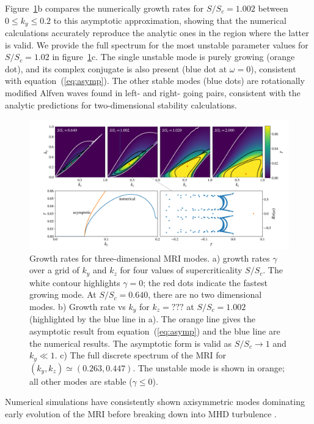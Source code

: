 \documentclass[aps,prl,reprint,superscriptaddress]{revtex4-1}
\newcommand{\SSC}{S/S_{c}}
\begin{document}
Figure~\ref{fig:growth_rate}b compares the numerically growth rates for $\SSC=1.002$ between $0 \le k_y \le 0.2$ to this asymptotic approximation, showing that the numerical calculations accurately reproduce the analytic ones in the region where the latter is valid.
We provide the full spectrum for the most unstable parameter values for $\SSC = 1.02$ in figure~\ref{fig:growth_rate}c.
The single unstable mode is purely growing (orange dot), and its complex conjugate is also present (blue dot at $\omega = 0$), consistent with equation~(\ref{eq:asymp}).
The other stable modes (blue dots) are rotationally modified Alfven waves found in left- and right- going pairs, consistent with the analytic predictions for two-dimensional stability calculations.
%

\begin{figure}[h!]
  \includegraphics[width=\textwidth]{fig_1.pdf}
  \caption{Growth rates for three-dimensional MRI modes. a) growth rates $\gamma$ over a grid of $k_y$ and $k_z$ for four values of supercriticality $\SSC$. The white contour highlights $\gamma = 0$; the red dots indicate the fastest growing mode. At $\SSC = 0.640$, there are no two dimensional modes. b) Growth rate vs $k_y$ for $k_z = ???$ at $\SSC = 1.002$ (highlighted by the blue line in a). The orange line gives the asymptotic result from equation~(\ref{eq:asymp}) and the blue line are the numerical results. The asymptotic form is valid as $\SSC \to 1$ and $k_y \ll 1$. c) The full discrete spectrum of the MRI for $(k_y, k_z) \simeq (0.263, 0.447)$. The unstable mode is shown in orange; all other modes are stable ($\gamma \le 0$).}
  \label{fig:growth_rate}
\end{figure}
%
Numerical simulations have consistently shown axisymmetric modes dominating early evolution of the MRI before breaking down into MHD turbulence \citep{1995ApJ...440..742H,2018ApJ...853..174H,2019ApJS..241...26D}. 
\end{document}
